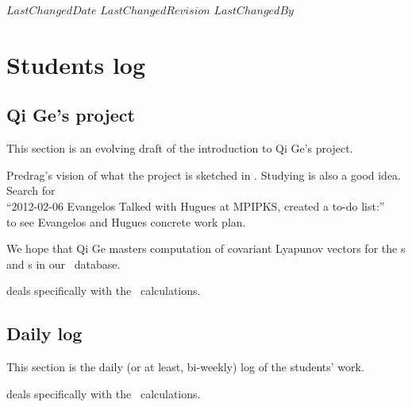 \ifsvnmulti
 {$LastChangedDate$}
 {$LastChangedRevision$} {$LastChangedBy$}
\fi

\chapter{Students log}
\label{c-students}

\section{Qi Ge's project}
\label{sect:introQG}
This section is an evolving draft of the introduction to Qi Ge's project.

Predrag's vision of what the project is sketched in . Studying
 is also a good idea.
Search for\\
``2012-02-06 Evangelos Talked with Hugues at MPIPKS, created a to-do list:''
\\
to see Evangelos and Hugues concrete work plan.

We hope that Qi Ge masters computation of covariant Lyapunov vectors for
the \po s and \rpo s in our \KS\ database.

 deals specifically with the \KS\ calculations.

\section{Daily log}

This section is the daily (or at least, bi-weekly)  log of the students'
work.

 deals specifically with the \KS\ calculations.


